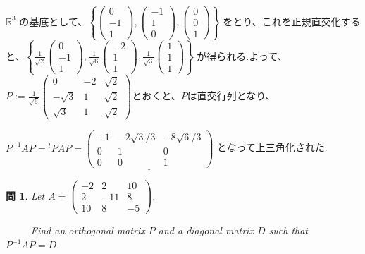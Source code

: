 \documentclass{jsarticle}
\newtheorem{question}{問}
\begin{document}
$\mathbb{R}^3$ の基底として、$\left\{\begin{pmatrix} 0 \\ -1 \\ 1 \end{pmatrix}, \begin{pmatrix} -1 \\ 1 \\ 0 \end{pmatrix}, \begin{pmatrix} 0 \\ 0 \\ 1 \end{pmatrix} \right \}$ をとり、これを正規直交化すると、$\left\{\displaystyle \frac{1}{\sqrt{2}} \begin{pmatrix} 0 \\ -1 \\ 1 \end{pmatrix}, \displaystyle \frac{1}{\sqrt{6}} \begin{pmatrix} -2 \\ 1 \\ 1 \end{pmatrix}, \displaystyle \frac{1}{\sqrt{3}} \begin{pmatrix} 1 \\ 1 \\ 1 \end{pmatrix} \right \}$ が得られる.よって、$P:= \displaystyle \frac{1}{\sqrt{6}} \begin{pmatrix} 0&-2&\sqrt{2} \\ -\sqrt{3}&1&\sqrt{2} \\ \sqrt{3}&1&\sqrt{2} \end{pmatrix}$とおくと、$P$は直交行列となり、

\bigskip

$P^{-1}AP = {}^tPAP = \underline{\begin{pmatrix} -1&-{2\sqrt{3}}/3&-{8\sqrt{6}}/3 \\ 0&1&0 \\ 0&0&1 \end{pmatrix}}$ となって上三角化された.
\bigskip
\bigskip
\bigskip

\begin{question}
Let $A= \begin{pmatrix} -2&2&10 \\ 2&-11&8 \\ 10&8&-5 \end{pmatrix}$. 

 \ \ \ \ \ Find an orthogonal matrix $P$ and a diagonal matrix $D$ such that $P^{-1}AP = D$.
\end{question}
\end{document}
